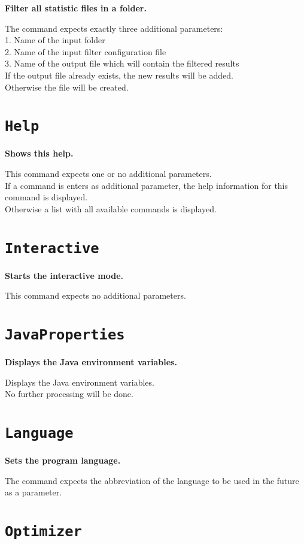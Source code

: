 \textbf{Filter all statistic files in a folder.}

The command expects exactly three additional parameters:\\
1. Name of the input folder\\
2. Name of the input filter configuration file\\
3. Name of the output file which will contain the filtered results\\
If the output file already exists, the new results will be added.\\
Otherwise the file will be created.

\section{\texttt{Help}}

\textbf{Shows this help.}

This command expects one or no additional parameters.\\
If a command is enters as additional parameter, the help information for this command is displayed.\\
Otherwise a list with all available commands is displayed.

\section{\texttt{Interactive}}

\textbf{Starts the interactive mode.}

This command expects no additional parameters.

\section{\texttt{JavaProperties}}

\textbf{Displays the Java environment variables.}

Displays the Java environment variables.\\
No further processing will be done.

\section{\texttt{Language}}

\textbf{Sets the program language.}

The command expects the abbreviation of the language to be used in the future as a parameter.

\section{\texttt{Optimizer}}

